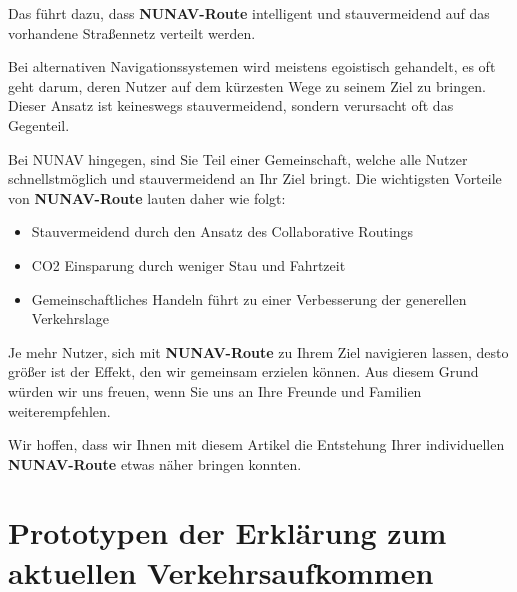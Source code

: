 \smallskip

\noindent Das führt dazu, dass \textbf{NUNAV-Route} intelligent und stauvermeidend auf das vorhandene Straßennetz verteilt werden.

\smallskip

\noindent Bei alternativen Navigationssystemen wird meistens egoistisch gehandelt, es oft geht darum, deren Nutzer auf dem kürzesten Wege zu seinem Ziel zu bringen. Dieser Ansatz ist keineswegs stauvermeidend, sondern verursacht oft das Gegenteil.

\smallskip

\noindent Bei NUNAV hingegen, sind Sie Teil einer Gemeinschaft, welche alle Nutzer schnellstmöglich und stauvermeidend an Ihr Ziel bringt. Die wichtigsten Vorteile von \textbf{NUNAV-Route} lauten daher wie folgt:

\begin{itemize}
    \item Stauvermeidend durch den Ansatz des Collaborative Routings
    \item CO2 Einsparung durch weniger Stau und Fahrtzeit
    \item Gemeinschaftliches Handeln führt zu einer Verbesserung der generellen Verkehrslage
\end{itemize}

\noindent Je mehr Nutzer, sich mit \textbf{NUNAV-Route} zu Ihrem Ziel navigieren lassen, desto größer ist der Effekt, den wir gemeinsam erzielen können. Aus diesem Grund würden wir uns freuen, wenn Sie uns an Ihre Freunde und Familien weiterempfehlen.

\smallskip

\noindent Wir hoffen, dass wir Ihnen mit diesem Artikel die Entstehung Ihrer individuellen \textbf{NUNAV-Route} etwas näher bringen konnten.

\newpage

\section*{Prototypen der Erklärung zum aktuellen Verkehrsaufkommen}
\label{sec:appendix_traffic_volume}


